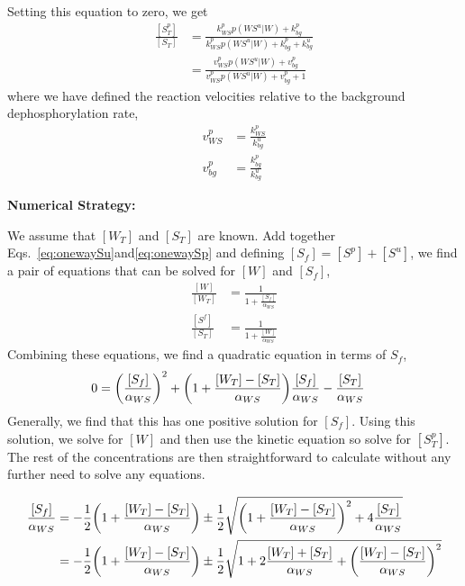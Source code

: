 \documentclass[aps,onecolumn,superscriptaddress,notitlepage]{revtex4-1}
\begin{document}
Setting this equation to zero, we get
\begin{align}
\frac{[S_T^p]}{[S_T]} &= \frac{k_{WS}^p p(WS^u|W) + k_{bg}^p}{k_{WS}^p p(WS^u|W) + k_{bg}^p+k_{bg}^u}\\
& = \frac{v_{WS}^p p(WS^u|W) + v_{bg}^p}{v_{WS}^p p(WS^u|W) + v_{bg}^p+1}
\end{align}
where we have defined the reaction velocities relative to the background dephosphorylation rate,
\begin{align}
v_{WS}^p &= \frac{k_{WS}^p}{k_{bg}^u}\\
v_{bg}^p &= \frac{k_{bg}^p}{k_{bg}^u}
\end{align}

\textbf{Numerical Strategy:}

We assume that  $[W_T]$ and $[S_T]$ are known. 
Add together Eqs.~\eqref{eq:onewaySu}and\eqref{eq:onewaySp} and defining $[S_f] = [S^p]+[S^u]$, 
we find a pair of equations that can be solved for $[W]$ and $[S_f]$,
\begin{align}
\frac{[W]}{[W_T]} & = \frac{1}{1 + \frac{[S_f]}{\alpha_{WS}}}\\
\frac{[S^f]}{[S_T]} &= \frac{1}{1 + \frac{[W]}{\alpha_{WS}}}
\end{align}
Combining these equations, we find a quadratic equation in terms of $S_f$,
\begin{align}
0 &= \qty(\frac{[S_f]}{\alpha_{WS}})^2 +  \qty(1+\frac{[W_T]-[S_T]}{\alpha_{WS}})\frac{[S_f]}{\alpha_{WS}} - \frac{[S_T]}{\alpha_{WS}}
\end{align}
Generally, we find that this has one positive solution for $[S_f]$. 
Using this solution, we solve for $[W]$ and then use the kinetic equation so solve for $[S_T^p]$. The rest of the concentrations are then straightforward to calculate without any further need to solve any equations.

\begin{align}
\frac{[S_f]}{\alpha_{WS}} &= -\frac{1}{2}\qty(1+\frac{[W_T]-[S_T]}{\alpha_{WS}})\pm \frac{1}{2}\sqrt{\qty(1+\frac{[W_T]-[S_T]}{\alpha_{WS}})^2 +4 \frac{[S_T]}{\alpha_{WS}}}\\
&= -\frac{1}{2}\qty(1+\frac{[W_T]-[S_T]}{\alpha_{WS}})\pm \frac{1}{2}\sqrt{1 + 2\frac{[W_T]+[S_T]}{\alpha_{WS}} + \qty(\frac{[W_T]-[S_T]}{\alpha_{WS}})^2 }
\end{align}
\end{document}
